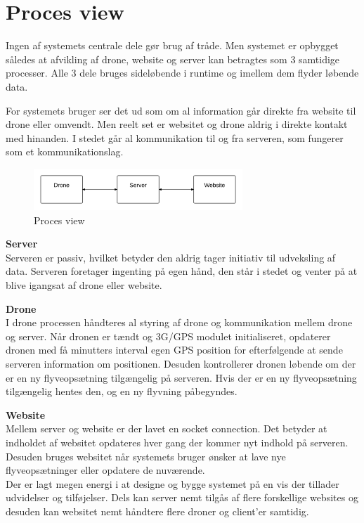 \section{Proces view}

Ingen af systemets centrale dele gør brug af tråde. Men systemet er opbygget således at afvikling af drone, website og server kan betragtes som 3 samtidige processer. Alle 3 dele bruges sideløbende i runtime og imellem dem flyder løbende data.

For systemets bruger ser det ud som om al information går direkte fra website til drone eller omvendt. Men reelt set er websitet og drone aldrig i direkte kontakt med hinanden. I stedet går al kommunikation til og fra serveren, som fungerer som et kommunikationslag. 

\vspace{-5pt}
\begin{figure}[H]
	\centering
	\includegraphics[width=0.7\textwidth]{Billeder/process_view}
	\vspace{0cm}
	\caption{Proces view}
	\label{fig:process_view}
\end{figure}

\textbf{Server}\\
Serveren er passiv, hvilket betyder den aldrig tager initiativ til udveksling af data. Serveren foretager ingenting på egen hånd, den står i stedet og venter på at blive igangsat af drone eller website. 
 
\textbf{Drone} \\
I drone processen håndteres al styring af drone og kommunikation mellem drone og server. Når dronen er tændt og 3G/GPS modulet initialiseret, opdaterer dronen med få minutters interval egen GPS position for efterfølgende at sende serveren information om positionen. Desuden kontrollerer dronen løbende om der er en ny flyveopsætning tilgængelig på serveren. Hvis der er en ny flyveopsætning tilgængelig hentes den, og en ny flyvning påbegyndes. 

\textbf{Website}\\
Mellem server og website er der lavet en socket connection. Det betyder at indholdet af websitet opdateres hver gang der kommer nyt indhold på serveren. Desuden bruges websitet når systemets bruger ønsker at lave nye flyveopsætninger eller opdatere de nuværende.\\


Der er lagt megen energi i at designe og bygge systemet på en vis der tillader udvidelser og tilføjelser. Dels kan server nemt tilgås af flere forskellige websites og desuden kan websitet nemt håndtere flere droner og client’er samtidig.
